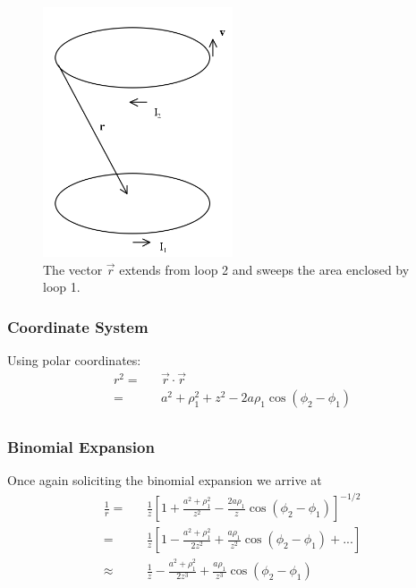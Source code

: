 \documentclass[12pt]{revtex4}
\begin{document}
\begin{figure}[h]
\begin{center}
\includegraphics[width=0.5\textwidth]{rext.png} 
\end{center}
\caption{\label{fig:2loop} The vector $\vec{r}$ extends from loop 2 and sweeps the area enclosed by loop 1.}
\end{figure}    


\subsubsection{Coordinate System}
Using polar coordinates:
\begin{eqnarray*}
r^{2}=&&\vec{r} \cdot \vec{r}\\
=&&a^{2}+\rho_{1}^2+z^{2}-2 a \rho_{1} \cos(\phi_{2} - \phi_{1})\\
\end{eqnarray*}

\subsubsection{Binomial Expansion}\label{bin.IV}
Once again soliciting the binomial expansion we arrive at 
\begin{eqnarray*}
\frac{1}{r}=&&\frac{1}{z}\left[1+\frac{a^2+\rho_{1}^2}{z^2}-\frac{2a\rho_{1}}{z} \cos(\phi_{2} - \phi_{1})\right]^{-1/2}\\
=&&\frac{1}{z}\left[1-\frac{a^2+\rho_{1}^2}{2 z^2}+\frac{a\rho_{1}}{z^2} \cos(\phi_{2} - \phi_{1})+...\right]\\
\approx&&\frac{1}{z}-\frac{a^2+\rho_{1}^2}{2 z^3}+\frac{a\rho_{1}}{z^3} \cos(\phi_{2} - \phi_{1})
\end{eqnarray*}
\end{document}
